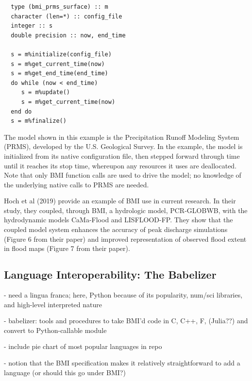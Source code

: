 \documentclass[12pt]{amsart}
\begin{document}
\begin{listing}[ht]
\begin{verbatim}
  type (bmi_prms_surface) :: m
  character (len=*) :: config_file
  integer :: s
  double precision :: now, end_time

  s = m%initialize(config_file)
  s = m%get_current_time(now)
  s = m%get_end_time(end_time)
  do while (now < end_time)
     s = m%update()
     s = m%get_current_time(now)
  end do
  s = m%finalize()
\end{verbatim}
\label{listing:bmi_code}
\end{listing}

The model shown in this example
is the Precipitation Runoff Modeling System (PRMS),
developed by the U.S. Geological Survey.
In the example,
the model is initialized from its native configuration file,
then stepped forward through time until it reaches its stop time,
whereupon any resources it uses are deallocated.
Note that only BMI function calls are used to drive the model;
no knowledge of the underlying native calls to PRMS are needed.

Hoch et al (2019) provide an example of BMI use in current research.
In their study,
they coupled, through BMI, a hydrologic model, PCR-GLOBWB,
with the hydrodynamic models CaMa-Flood and LISFLOOD-FP.
They show that the coupled model system
enhances the accuracy of peak discharge simulations
(Figure 6 from their paper)
and improved representation of observed flood extent in flood maps
(Figure 7 from their paper).

\subsection{Language Interoperability: The Babelizer}

- need a lingua franca; here, Python because of its popularity, num/sci libraries, and high-level interpreted nature

- babelizer: tools and procedures to take BMI'd code in C, C++, F, (Julia??) and convert to Python-callable module

- include pie chart of most popular languages in repo

- notion that the BMI specification makes it relatively straightforward to add a language (or should this go under BMI?)
\end{document}
